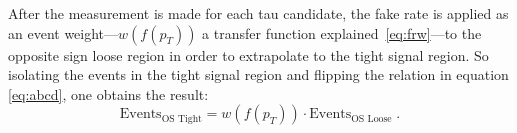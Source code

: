 After the measurement is made for each tau candidate, the fake rate is applied as an event weight---$w(f(p_T))$ a transfer function explained~\ref{eq:frw}---to the opposite sign loose region in order to extrapolate to the tight signal region. So isolating the events in the tight signal region and flipping the relation in equation \ref{eq:abcd}, one obtains the result: 
\begin{equation}
\text{Events}_\text{OS Tight} = w(f(p_T))\cdot \text{Events}_\text{OS Loose} \;\text{.}
\end{equation}

%
%
%
%
